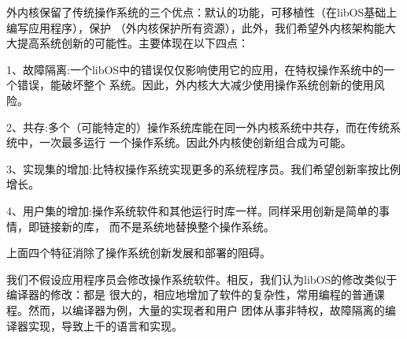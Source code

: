 \documentclass[12pt,openany,a4paper]{report}
\begin{document}
	    外内核保留了传统操作系统的三个优点：默认的功能，可移植性（在libOS基础上编写应用程序），保护
	（外内核保护所有资源），此外，我们希望外内核架构能大大提高系统创新的可能性。主要体现在以下四点：
	\par
	    1、故障隔离:一个libOS中的错误仅仅影响使用它的应用，在特权操作系统中的一个错误，能破坏整个
	系统。因此，外内核大大减少使用操作系统创新的使用风险。\par
	    2、共存:多个（可能特定的）操作系统库能在同一外内核系统中共存，而在传统系统中，一次最多运行
	一个操作系统。因此外内核使创新组合成为可能。\par
	    3、实现集的增加:比特权操作系统实现更多的系统程序员。我们希望创新率按比例增长。\par
	    4、用户集的增加:操作系统软件和其他运行时库一样。同样采用创新是简单的事情，即链接新的库，
	而不是系统地替换整个操作系统。\par
	    上面四个特征消除了操作系统创新发展和部署的阻碍。\par
	    我们不假设应用程序员会修改操作系统软件。相反，我们认为libOS的修改类似于编译器的修改：都是
	很大的，相应地增加了软件的复杂性，常用编程的普通课程。然而，以编译器为例，大量的实现者和用户
	团体从事非特权，故障隔离的编译器实现，导致上千的语言和实现。\par
\end{document}
